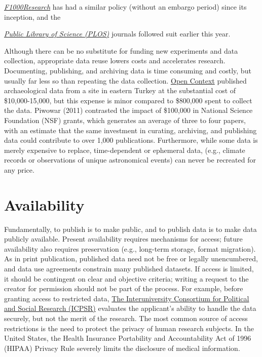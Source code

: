 \documentclass[10pt,a4paper,twocolumn]{article}
\begin{document}
\href{http://f1000research.com}{\emph{F1000Research}} has had a similar policy (without an embargo period) since its inception, and the {\href{http://www.plos.org/}{\emph{Public Library of Science (PLOS)}} journals followed suit earlier this year\cite{bloom_data_2014}.

Although there can be no substitute for funding new experiments and data collection, appropriate data reuse lowers costs and accelerates research.
Documenting, publishing, and archiving data is time consuming and costly, but usually far less so than repeating the data collection.
\href{http://opencontext.org/}{Open Context} published archaeological data from a site in eastern Turkey at the substantial cost of \$10,000-15,000, but this expense is minor compared to \$800,000 spent to collect the data\cite{kansa_we_2013}.
Piwowar (2011) contrasted the impact of \$100,000 in National Science Foundation (NSF) grants, which generates an average of three to four papers, with an estimate that the same investment in curating, archiving, and publishing data could contribute to over 1,000 publications\cite{piwowar_data_2011}.
Furthermore, while some data is merely expensive to replace, time-dependent or ephemeral data, (e.g., climate records or observations of unique astronomical events) can never be recreated for any price\cite{gray_online_2002}.

\section*{Availability}\label{availability}

Fundamentally, to publish is to make public, and to publish data is to make data publicly available.
Present availability requires mechanisms for access; future availability also requires preservation (e.g., long-term storage, format migration)\cite{waters_preserving_1996, beagrie_digital_2008, gray_online_2002}.
As in print publication, published data need not be free or legally unencumbered, and data use agreements constrain many published datasets.
If access is limited, it should be contingent on clear and objective criteria; writing a request to the creator for permission should not be part of the process.
For example, before granting access to restricted data, \href{http://www.icpsr.umich.edu/icpsrweb/content/deposit/confidentiality.html}{The Interuniversity Consortium for Political and Social Research (ICPSR)} evaluates the applicant's ability to handle the data securely, but not the merit of the research.
The most common source of access restrictions is the need to protect the privacy of human research subjects.
In the United States, the Health Insurance Portability and Accountability Act of 1996 (HIPAA) Privacy Rule severely limits the disclosure of medical information\cite{office_for_civil_rights_renal_2003}.

}
\end{document}

